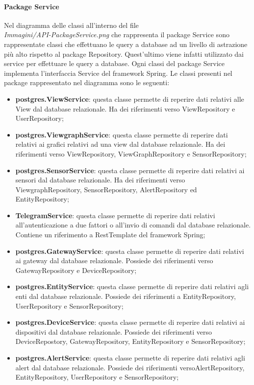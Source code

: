 \begin{landscape}
		\paragraph*{Package Service}
		Nel diagramma delle classi all'interno del file \\ \textit{Immagini/API-PackageService.png} che rappresenta il package Service sono rappresentate classi che effettuano le query a database ad un livello di astrazione più alto rispetto al package Repository. Quest'ultimo viene infatti utilizzato dai service per effettuare le query a database.
		Ogni classi del package Service implementa l'interfaccia Service del framework Spring.
		Le classi presenti nel package rappresentato nel diagramma sono le seguenti:
		\begin{itemize}
			\item \textbf{postgres.ViewService}: questa classe permette di reperire dati relativi alle View dal database relazionale. Ha dei riferimenti verso ViewRepository e UserRepository;
			\item \textbf{postgres.ViewgraphService}: questa classe permette di reperire dati relativi ai grafici relativi ad una view dal database relazionale. Ha dei riferimenti verso ViewRepository, ViewGraphRepository e SensorRepository;
			\item \textbf{postgres.SensorService}: questa classe permette di reperire dati relativi ai sensori dal database relazionale. Ha dei riferimenti verso ViewgraphRepository, SensorRepository, AlertRepository ed EntityRepository;
			\item \textbf{TelegramService}: questa classe permette di reperire dati relativi all'autenticazione a due fattori o all'invio di comandi dal database relazionale. Contiene un riferimento a RestTemplate del framework Spring;
			\item \textbf{postgres.GatewayService}: questa classe permette di reperire dati relativi ai gateway dal database relazionale. Possiede dei riferimenti verso GatewayRepository e DeviceRepository;
			\item \textbf{postgres.EntityService}: questa classe permette di reperire dati relativi agli enti dal database relazionale. Possiede dei riferimenti a EntityRepository, UserRepository e SensorRepository;
			\item \textbf{postgres.DeviceService}: questa classe permette di reperire dati relativi ai dispositivi  dal database relazionale. Possiede dei riferimenti verso DeviceRepostory, GatewayRepository, EntityRepository e SensorRepository;
			\item \textbf{postgres.AlertService}: questa classe permette di reperire dati relativi agli alert dal database relazionale. Possiede dei riferimenti versoAlertRepository, EntityRepository, UserRepository e SensorRepository;

\end{itemize}
\end{landscape}
